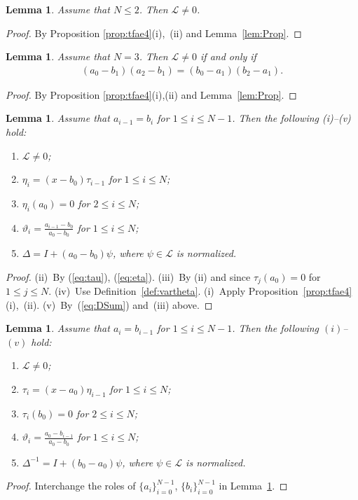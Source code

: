 \documentclass[pdftex]{sigma}
\numberwithin{equation}{section}
\newtheorem{Lemma}[Theorem]{Lemma}
\begin{document}
\begin{Lemma}\label{lem:n2}
Assume that $N\leq 2$. Then $\mathcal L\not=0$.
\end{Lemma}
\begin{proof} By Proposition \ref{prop:tfae4}(i),~(ii) and Lemma~\ref{lem:Prop}.
\end{proof}

\begin{Lemma}\label{lem:N3}
Assume that $N=3$. Then $\mathcal L\not=0$ if and only if
\begin{gather*}
(a_0 - b_1)(a_2-b_1) = (b_0 - a_1)(b_2-a_1).%
\end{gather*}
\end{Lemma}
\begin{proof} By Proposition \ref{prop:tfae4}(i),(ii) and Lemma~\ref{lem:Prop}.
\end{proof}

\begin{Lemma}\label{lem:five}
Assume that $a_{i-1} = b_i$ for $1 \leq i \leq N-1$. Then the following {\rm (i)--(v)} hold:
\begin{enumerate}\itemsep=0pt
\item[$(i)$] $\mathcal L\not=0$;
\item[$(ii)$] $\eta_i = (x-b_0) \tau_{i-1}$ for $1 \leq i \leq N$;
\item[$(iii)$] $\eta_i(a_0)=0$ for $2 \leq i \leq N$;
\item[$(iv)$] $\vartheta_i = \frac{a_{i-1}-b_0}{a_0-b_0}$ for $
1 \leq i \leq N$;
\item[$(v)$] $\Delta = I + (a_0-b_0)\psi$, where $\psi \in \mathcal L$ is normalized.
\end{enumerate}
\end{Lemma}
\begin{proof} (ii)~By (\ref{eq:tau}), (\ref{eq:eta}).
(iii)~By (ii) and since $\tau_j(a_0)=0 $ for $1 \leq j \leq N$.
(iv)~Use Definition~\ref{def:vartheta}.
(i)~Apply Proposition~\ref{prop:tfae4}(i),~(ii).
(v)~By~(\ref{eq:DSum}) and~(iii) above.
\end{proof}

\begin{Lemma}\label{lem:fivedual}
Assume that $a_{i} = b_{i-1}$ for $1 \leq i \leq N-1$.
Then the following $(i)$--$(v)$ hold:
\begin{enumerate}\itemsep=0pt
\item[$(i)$] $\mathcal L\not=0$;
\item[$(ii)$] $\tau_i = (x-a_0) \eta_{i-1}$ for $1 \leq i \leq N$;
\item[$(iii)$] $\tau_i(b_0)=0$ for $2 \leq i \leq N$;
\item[$(iv)$] $\displaystyle{
\vartheta_i = \frac{a_{0}-b_{i-1}}{a_0-b_0}}$ for $ 1 \leq i \leq N$;
\item[$(v)$] $\Delta^{-1} = I + (b_0-a_0)\psi$, where $\psi \in \mathcal L$
is normalized.
\end{enumerate}
\end{Lemma}
\begin{proof} Interchange the roles of
$\lbrace a_i\rbrace_{i=0}^{N-1}$,
$\lbrace b_i\rbrace_{i=0}^{N-1}$ in Lemma~\ref{lem:five}.
\end{proof}
\end{document}
